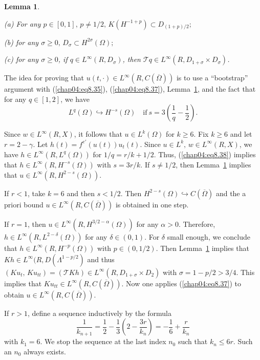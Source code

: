 \documentclass{surv-l}
\theoremstyle{plain}
\newtheorem{lemma}[theorem]{Lemma}
\theoremstyle{definition}
\numberwithin{equation}{section}
\numberwithin{figure}{chapter}
\begin{document}
\begin{lemma}\label{lem4.8.14}

\textrm{(a)} For any $p\in[0, 1],\, p\neq 1/2,\, K(H^{-1+p})\subset D_{(1+p)/2};$

\textrm{(b)} for any $\sigma\geq 0,\, D_{\sigma}\subset H^{2\sigma}(\Omega);$

\textrm{(c)} for any $\sigma\geq 0$, if $q\in L^{\infty}(R, D_{\sigma})$, then $\mathcal{T}q\in L^{\infty}(R, D_{1+\sigma}\times D_{\sigma})$.
\end{lemma}

The idea for proving that $u(t, \cdot)\in L^{\infty}(R, C(\overline{\Omega}))$ is to use a ``bootstrap'' argument with (\ref{chap04:eq8.35}), (\ref{chap04:eq8.37}), Lemma~\ref{lem4.8.14}, and the fact that for any $q\in[1,2]$, we have
\begin{equation}\label{chap04:eq8.38}
L^{q}(\Omega)\hookrightarrow H^{-s}(\Omega)\quad \mathrm{if}\ s=3\left(\frac{1}{q}-\frac{1}{2}\right).
\end{equation}

Since $w\in L^{\infty}(R, X)$, it follows that $u\in L^{k}(\Omega)$ for $k\geq 6$. Fix $k\geq 6$ and let $ r=2-\gamma$. Let $h(t)=f^{e\prime}(u(t))u_{t}(t)$. Since $u\in L^{k},\,w\in L^{\infty}(R, X)$, we have $h\in L^{\infty}(R, L^{q}(\Omega))$ for $1/q=r/k+1/2$. Thus, (\ref{chap04:eq8.38}) implies that $h\in L^{\infty}(R, H^{-s}(\Omega))$ with $s=3r/k$. If $s\neq 1/2$, then Lemma~\ref{lem4.8.14} implies that $u\in L^{\infty}(R, H^{2-s}(\Omega))$.

If $r<1$, take $k=6$ and then $s<1/2$. Then $H^{2-s}(\Omega)\hookrightarrow C(\overline{\Omega})$ and the a priori bound $u\in L^{\infty}(R, C(\overline{\Omega}))$ is obtained in one step.

If $r=1$, then $u\in L^{\infty}(R, H^{3/2-\alpha}(\Omega))$ for any $\alpha>0$. Therefore, $ h\in L^{\infty}(R, L^{2-\delta}(\Omega))$ for any $\delta\in(0,1)$. For $\delta$ small enough, we conclude that $h\in L^{\infty}(R, H^{-p}(\Omega))$ with $p\in(0,1/2)$. Then Lemma~\ref{lem4.8.14} implies that $ Kh\in L^{\infty}(R, D(\Lambda^{1-p/2})$ and thus $(Ku_{t},\, Ku_{tt})=(\mathcal{T}Kh)\in L^{\infty}(R, D_{1+\sigma}\times D_{2})$ with $\sigma=1-p/2>3/4$. This implies that $Ku_{tt}\in L^{\infty}(R, C(\overline{\Omega}))$. Now one applies (\ref{chap04:eq8.37}) to obtain $u\in L^{\infty}(R, C(\overline{\Omega}))$.

If $r>1$, define a sequence inductively by the formula
\begin{equation}\label{chap04:eq8.39}
\frac{1}{k_{n+1}}=\frac{1}{2}-\frac{1}{3}\left(2-\frac{3r}{k_{n}}\right)=-\frac{1}{6}+\frac{r}{k_{n}}
\end{equation}
with $k_{1}=6$. We stop the sequence at the last index $n_{0}$ such that $k_{n}\leq 6r$. Such an $n_{0}$ always exists.
\end{document}
